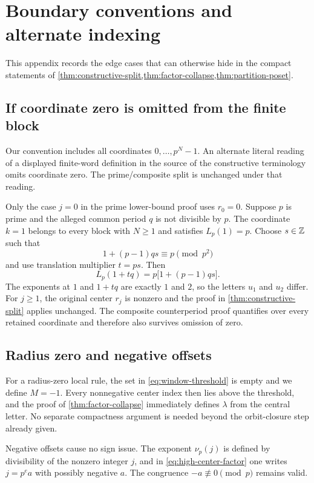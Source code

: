 \section{Boundary conventions and alternate indexing}
\label{app:boundary-conventions}

This appendix records the edge cases that can otherwise hide in the compact
statements of \cref{thm:constructive-split,thm:factor-collapse,thm:partition-poset}.

\subsection{If coordinate zero is omitted from the finite block}

Our convention includes all coordinates $0,\dots,p^N-1$.  An alternate
literal reading of a displayed finite-word definition in the source of the
constructive terminology omits coordinate zero.  The prime/composite split
is unchanged under that reading.

Only the case $j=0$ in the prime lower-bound proof uses $r_0=0$.  Suppose
$p$ is prime and the alleged common period $q$ is not divisible by $p$.
The coordinate $k=1$ belongs to every block with $N\geq1$ and satisfies
$L_p(1)=p$.  Choose $s\in\mathbb Z$ such that
\begin{equation}
  1+(p-1)qs\equiv p\pmod {p^2}
  \label{eq:alternate-index-witness}
\end{equation}
and use translation multiplier $t=ps$.  Then
\[
  L_p(1+tq)=p\bigl[1+(p-1)qs\bigr].
\]
The exponents at $1$ and $1+tq$ are exactly $1$ and $2$, so the letters
$u_1$ and $u_2$ differ.  For $j\geq1$, the original center $r_j$ is
nonzero and the proof in \cref{thm:constructive-split} applies unchanged.
The composite counterperiod proof quantifies over every retained coordinate
and therefore also survives omission of zero.

\subsection{Radius zero and negative offsets}

For a radius-zero local rule, the set in \cref{eq:window-threshold} is
empty and we define $M=-1$.  Every nonnegative center index then lies above
the threshold, and the proof of \cref{thm:factor-collapse} immediately
defines $\lambda$ from the central letter.  No separate compactness
argument is needed beyond the orbit-closure step already given.

Negative offsets cause no sign issue.  The exponent $\nu_p(j)$ is defined
by divisibility of the nonzero integer $j$, and in
\cref{eq:high-center-factor} one writes $j=p^e a$ with possibly negative
$a$.  The congruence $-a\not\equiv0\pmod p$ remains valid.

